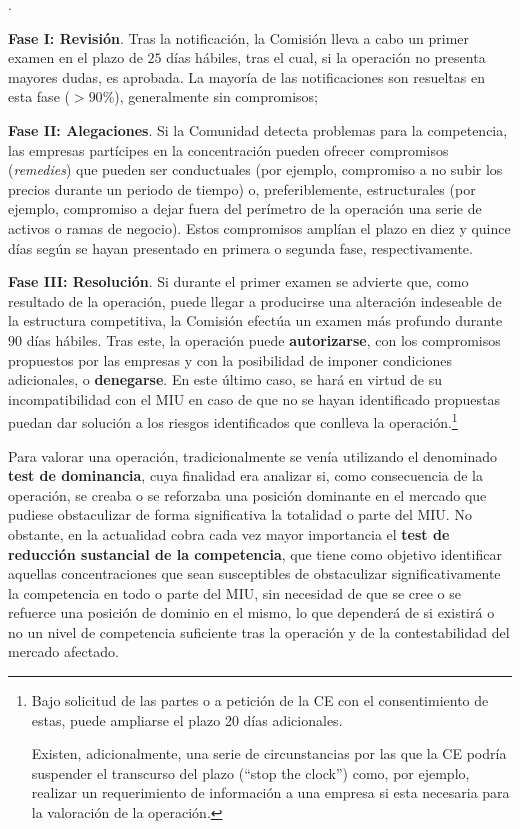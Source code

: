 \documentclass[10pt,a4paper]{article}
\newcounter{numitem}
\newenvironment{lnum}
      {\begin{list}{\arabic{numitem}.}{%
          \usecounter{numitem}%
          \setlength{\leftmargin}{1cm}%
          \setlength{\parskip}{3pt}%
          \setlength{\itemsep}{0pt}%
          \setlength{\parsep}{0pt}%
      }}
      {\end{list}}
\begin{document}
\begin{lnum}
    \item \textbf{Fase I: Revisión}. Tras la notificación, la Comisión lleva a cabo un primer examen en el plazo de $25$ días hábiles, tras el cual, si la operación no presenta mayores dudas, es aprobada. La mayoría de las notificaciones son resueltas en esta fase ($>90\%$), generalmente sin compromisos;
    \item \textbf{Fase II: Alegaciones}. Si la Comunidad detecta problemas para la competencia, las empresas partícipes en la concentración pueden ofrecer compromisos (\textit{remedies}) que pueden ser conductuales (por ejemplo, compromiso a no subir los precios durante un periodo de tiempo) o, preferiblemente, estructurales (por ejemplo, compromiso a dejar fuera del perímetro de la operación una serie de activos o ramas de negocio). Estos compromisos amplían el plazo en diez y quince días según se hayan presentado en primera o segunda fase, respectivamente.
    \item \textbf{Fase III: Resolución}. Si durante el primer examen se advierte que, como resultado de la operación, puede llegar a producirse una alteración indeseable de la estructura competitiva, la Comisión efectúa un examen más profundo durante $90$ días hábiles. Tras este, la operación puede \textbf{autorizarse}, con los compromisos propuestos por las empresas y con la posibilidad de imponer condiciones adicionales, o \textbf{denegarse}. En este último caso, se hará en virtud de su incompatibilidad con el MIU en caso de que no se hayan identificado propuestas puedan dar solución a los riesgos identificados que conlleva la operación.\footnote{%
        Bajo solicitud de las partes o a petición de la CE con el consentimiento de estas, puede ampliarse el plazo 20 días adicionales. 
    
    Existen, adicionalmente, una serie de circunstancias por las que la CE podría suspender el transcurso del plazo (“stop the clock”) como, por ejemplo, realizar un requerimiento de información a una empresa si esta necesaria para la valoración de la operación.
    }
\end{lnum}

Para valorar una operación, tradicionalmente se venía utilizando el denominado \textbf{test de dominancia}, cuya finalidad era analizar si, como consecuencia de la operación, se creaba o se reforzaba una posición dominante en el mercado que pudiese obstaculizar de forma significativa la totalidad o parte del MIU. No obstante, en la actualidad cobra cada vez mayor importancia el \textbf{test de reducción sustancial de la competencia}, que tiene como objetivo identificar aquellas concentraciones que sean susceptibles de obstaculizar significativamente la competencia en todo o parte del MIU, sin necesidad de que se cree o se refuerce una posición de dominio en el mismo, lo que dependerá de si existirá o no un nivel de competencia suficiente tras la operación y de la contestabilidad del mercado afectado.
\end{document}
